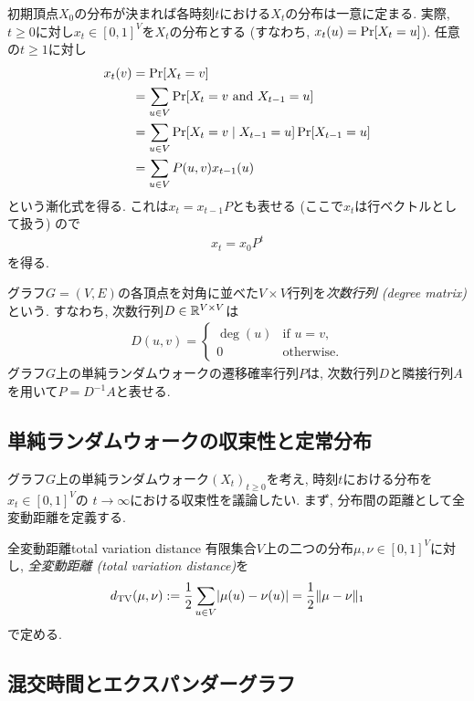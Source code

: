 初期頂点$X_0$の分布が決まれば各時刻$t$における$X_t$の分布は一意に定まる.
実際, $t\ge 0$に対し$x_t \in [0,1]^{V}$を$X_t$の分布とする
  (すなわち, $x_t(u) = \Pr\sbra*{X_t = u}$).
任意の$t\ge 1$に対し
\begin{align*}
  x_t(v) &= \Pr\sbra*{X_t = v} \\
    &= \sum_{u\in V}\Pr\sbra*{ X_t = v \tand X_{t-1} = u} \\
    &= \sum_{u\in V}\Pr\sbra*{ X_t = v \condition X_{t-1} = u} \Pr\sbra*{X_{t-1} = u}  \\
    &= \sum_{u\in V} P(u,v) x_{t-1}(u)
\end{align*}
という漸化式を得る.
これは$x_{t} = x_{t-1} P$とも表せる (ここで$x_t$は行ベクトルとして扱う) ので
\begin{align}
  x_t = x_0 P^t \label{eq:x_t SRW}
\end{align}
を得る.

  グラフ$G=(V,E)$の各頂点を対角に並べた$V\times V$行列を\emph{次数行列 (degree matrix)}という.
  すなわち, 次数行列$D\in \mathbb{R}^{V\times V}$は
  \begin{align*}
    D(u,v) = \begin{cases}
      \deg(u)	& \text{if }u=v,\\
      0 & \text{otherwise}.
    \end{cases}
  \end{align*}
  グラフ$G$上の単純ランダムウォークの遷移確率行列$P$は, 次数行列$D$と隣接行列$A$を用いて$P=D^{-1}A$と表せる.

\subsection{単純ランダムウォークの収束性と定常分布}
グラフ$G$上の単純ランダムウォーク$(X_t)_{t\ge 0}$を考え, 時刻$t$における分布を$x_t \in [0,1]^V$の
$t\to \infty$における収束性を議論したい.
まず, 分布間の距離として全変動距離を定義する.
\begin{definition}{全変動距離}{total variation distance}
  有限集合$V$上の二つの分布$\mu,\nu \in[0,1]^V$に対し, \emph{全変動距離 (total variation distance)}を
  \[
    d_{\mathrm{TV}} (\mu ,\nu ) \mathrel{:=} \frac{1}{2} \sum_{u\in V}\lvert\mu(u) - \nu(u)\rvert = \frac{1}{2} \lVert\mu - \nu\rVert_1
  \]
  で定める.
\end{definition}


\subsection{混交時間とエクスパンダーグラフ}